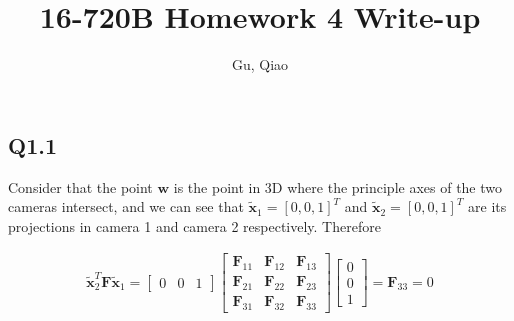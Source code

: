 \documentclass[11pt]{article}
\begin{document}
\author{Gu, Qiao}
\title{16-720B Homework 4 Write-up}
\maketitle

\medskip

\subsection*{Q1.1}

\newcommand{\intrinsic}{\mathbf{K}}
\newcommand{\fundamental}{\mathbf{F}}
\newcommand{\essential}{\mathbf{E}}
\newcommand{\homox}{\tilde{\mathbf{x}}}

Consider that the point $\mathbf{w}$ is the point in 3D where the principle axes of the two cameras intersect, and we can see that $\homox_1=[0,0,1]^T$ and $\homox_2=[0,0,1]^T$ are its projections in camera 1 and camera 2 respectively. Therefore

\begin{align}
    \homox_2^T \fundamental \homox_1 =
    \begin{bmatrix}
        0 & 0 & 1
    \end{bmatrix}
    \begin{bmatrix}
        \fundamental_{11} & \fundamental_{12} & \fundamental_{13} \\
        \fundamental_{21} & \fundamental_{22} & \fundamental_{23} \\
        \fundamental_{31} & \fundamental_{32} & \fundamental_{33}
    \end{bmatrix}
    \begin{bmatrix}
        0 \\ 0 \\ 1
    \end{bmatrix}
    = \fundamental_{33} = 0
\end{align}


%
\end{document}
